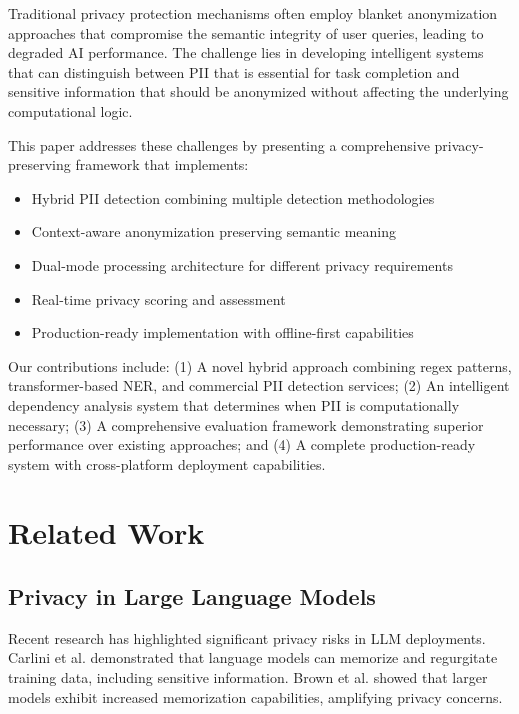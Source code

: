 \documentclass[conference]{IEEEtran}
\begin{document}
Traditional privacy protection mechanisms often employ blanket anonymization approaches that compromise the semantic integrity of user queries, leading to degraded AI performance. The challenge lies in developing intelligent systems that can distinguish between PII that is essential for task completion and sensitive information that should be anonymized without affecting the underlying computational logic.

This paper addresses these challenges by presenting a comprehensive privacy-preserving framework that implements:

\begin{itemize}
\item Hybrid PII detection combining multiple detection methodologies
\item Context-aware anonymization preserving semantic meaning
\item Dual-mode processing architecture for different privacy requirements
\item Real-time privacy scoring and assessment
\item Production-ready implementation with offline-first capabilities
\end{itemize}

Our contributions include: (1) A novel hybrid approach combining regex patterns, transformer-based NER, and commercial PII detection services; (2) An intelligent dependency analysis system that determines when PII is computationally necessary; (3) A comprehensive evaluation framework demonstrating superior performance over existing approaches; and (4) A complete production-ready system with cross-platform deployment capabilities.

\section{Related Work}

\subsection{Privacy in Large Language Models}

Recent research has highlighted significant privacy risks in LLM deployments. Carlini et al. \cite{ref2} demonstrated that language models can memorize and regurgitate training data, including sensitive information. Brown et al. \cite{ref3} showed that larger models exhibit increased memorization capabilities, amplifying privacy concerns.
\end{document}
